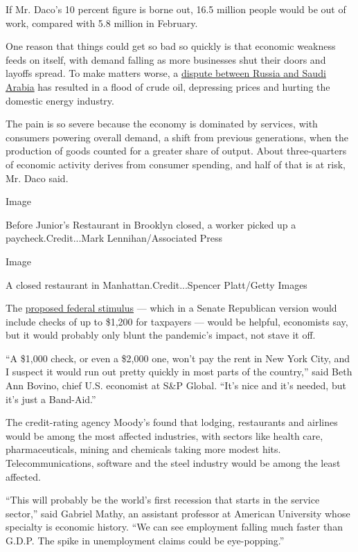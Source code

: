 If Mr. Daco's 10 percent figure is borne out, 16.5 million people would
be out of work, compared with 5.8 million in February.

One reason that things could get so bad so quickly is that economic
weakness feeds on itself, with demand falling as more businesses shut
their doors and layoffs spread. To make matters worse, a
\href{https://www.nytimes3xbfgragh.onion/2020/03/09/business/energy-environment/oil-opec-saudi-russia.html}{dispute
between Russia and Saudi Arabia} has resulted in a flood of crude oil,
depressing prices and hurting the domestic energy industry.

The pain is so severe because the economy is dominated by services, with
consumers powering overall demand, a shift from previous generations,
when the production of goods counted for a greater share of output.
About three-quarters of economic activity derives from consumer
spending, and half of that is at risk, Mr. Daco said.

Image

Before Junior's Restaurant in Brooklyn closed, a worker picked up a
paycheck.Credit...Mark Lennihan/Associated Press

Image

A closed restaurant in Manhattan.Credit...Spencer Platt/Getty Images

The
\href{https://www.nytimes3xbfgragh.onion/2020/03/19/us/politics/1000-checks-coronavirus-stimulus.html}{proposed
federal stimulus} --- which in a Senate Republican version would include
checks of up to \$1,200 for taxpayers --- would be helpful, economists
say, but it would probably only blunt the pandemic's impact, not stave
it off.

``A \$1,000 check, or even a \$2,000 one, won't pay the rent in New York
City, and I suspect it would run out pretty quickly in most parts of the
country,'' said Beth Ann Bovino, chief U.S. economist at S\&P Global.
``It's nice and it's needed, but it's just a Band-Aid.''

The credit-rating agency Moody's found that lodging, restaurants and
airlines would be among the most affected industries, with sectors like
health care, pharmaceuticals, mining and chemicals taking more modest
hits. Telecommunications, software and the steel industry would be among
the least affected.

``This will probably be the world's first recession that starts in the
service sector,'' said Gabriel Mathy, an assistant professor at American
University whose specialty is economic history. ``We can see employment
falling much faster than G.D.P. The spike in unemployment claims could
be eye-popping.''

